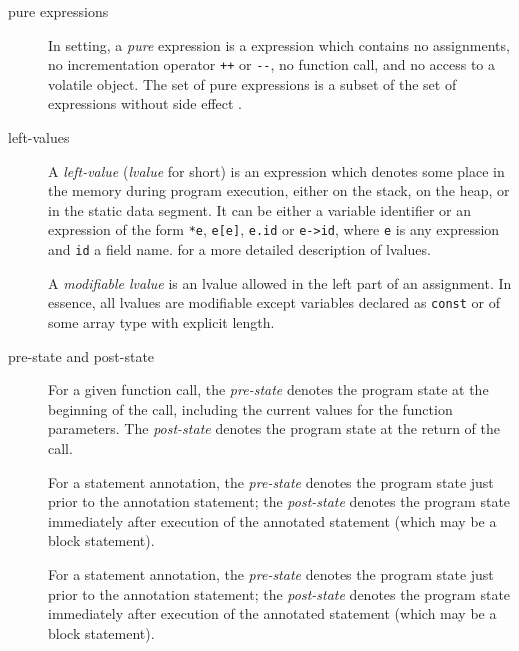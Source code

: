 \documentclass[web]{frama-c-book}
\begin{document}
\begin{description}
\item[pure expressions]  In \NAME setting, a
  \emph{pure} expression is a \lang expression which contains no assignments, no
  incrementation operator \lstinline|++| or \lstinline|--|, no function call,
  and no access to a volatile object. The set of pure expressions is a
  subset of the set of \lang expressions without side effect
  \iftoggle{isCPP}
  {(C++ standard~\cite{C++-2011}, \S 1.9, [intro.execution], alinea 2)}
  {(C standard~\cite{KR88,standardc99}, \S 5.1.2.3, alinea 2)}.

\item[left-values] 

  A \emph{left-value} (\emph{lvalue} for short) is an expression which
  denotes some place in the memory during program execution, either on
  the stack, on the heap, or in the static data segment. It can be
  either a variable identifier or an expression of the form \lstinline|*e|,
  \lstinline|e[e]|, \lstinline|e.id| or \lstinline|e->id|, where
  \lstinline |e| is any expression and \lstinline|id| a field name.
  \iftoggle{isCPP}
  {See C++ standard, \S 3.10 [basic.lval]}
  {See C standard, \S 6.3.2.1}
  for a more detailed description of lvalues.

  A \emph{modifiable lvalue} is an lvalue allowed in the left part of
  an assignment. In essence, all lvalues are modifiable except
  variables declared as \texttt{const} or of some array type with
  explicit length.

\item[pre-state and post-state]

    For a given function call, the \emph{pre-state} denotes the
    program state at the beginning of the call, including the
    current values for the function parameters. The \emph{post-state}
    denotes the program state at the return of the call.

    For a statement annotation, the \emph{pre-state} denotes the
    program state just prior to the annotation statement; the
    \emph{post-state}
    denotes the program state immediately after execution of the annotated statement (which may be a block statement).

    For a statement annotation, the \emph{pre-state} denotes the
    program state just prior to the annotation statement; the
    \emph{post-state}
    denotes the program state immediately after execution of the annotated statement (which may be a block statement).


\end{description}
\end{document}
